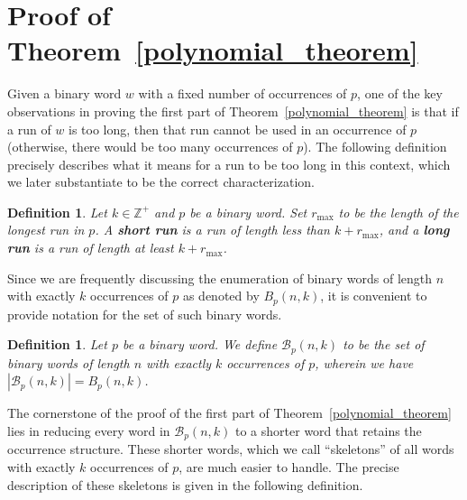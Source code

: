 \documentclass[11pt]{amsart}
\newtheorem{definition}[theorem]{Definition}
\newcommand{\ZZ}{\mathbb{Z}}
\begin{document}
\section{Proof of Theorem~\ref{polynomial_theorem}}\label{section_2}

Given a binary word $w$ with a fixed number of occurrences of $p$, one of the key observations in proving the first part of Theorem~\ref{polynomial_theorem} is that if a run of $w$ is too long, then that run cannot be used in an occurrence of $p$ (otherwise, there would be too many occurrences of $p$). The following definition precisely describes what it means for a run to be too long in this context, which we later substantiate to be the correct characterization.

\begin{definition}
    Let $k\in\ZZ^+$ and $p$ be a binary word. Set $r_{\max}$ to be the length of the longest run in $p$. A \textbf{short run} is a run of length less than $k+r_{\max}$, and a \textbf{long run} is a run of length at least $k+r_{\max}$.
\end{definition}

Since we are frequently discussing the enumeration of binary words of length $n$ with exactly $k$ occurrences of $p$ as denoted by $B_p(n,k)$, it is convenient to provide notation for the set of such binary words.

\begin{definition}
    Let $p$ be a binary word. We define $\mathcal{B}_{p}(n,k)$ to be the set of binary words of length $n$ with exactly $k$ occurrences of $p$, wherein we have $|\mathcal{B}_{p}(n,k)|=B_p(n,k)$.
\end{definition}

The cornerstone of the proof of the first part of Theorem~\ref{polynomial_theorem} lies in reducing every word in $\mathcal{B}_p(n,k)$ to a shorter word that retains the occurrence structure. These shorter words, which we call ``skeletons'' of all words with exactly $k$ occurrences of $p$, are much easier to handle. %
The precise description of these skeletons is given in the following definition.
\end{document}
